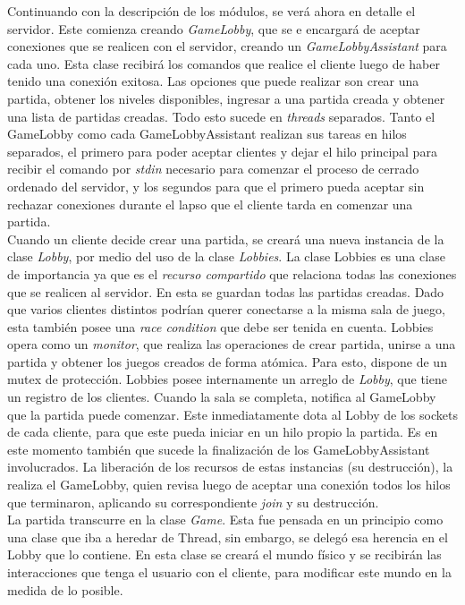 Continuando con la descripción de los módulos, se verá ahora en detalle el servidor. Este comienza creando \emph{GameLobby}, que se e encargará de aceptar conexiones que se realicen con el servidor, creando un \emph{GameLobbyAssistant} para cada uno. Esta clase recibirá los comandos que realice el cliente luego de haber tenido una conexión exitosa. Las opciones que puede realizar son crear una partida, obtener los niveles disponibles, ingresar a una partida creada y obtener una lista de partidas creadas. Todo esto sucede en  \emph{threads} separados. Tanto el GameLobby como cada GameLobbyAssistant realizan sus tareas en hilos separados, el primero para poder aceptar clientes y dejar el hilo principal para recibir el comando por \emph{stdin} necesario para comenzar el proceso de cerrado ordenado del servidor, y los segundos para que el primero pueda aceptar sin rechazar conexiones durante el lapso que el cliente tarda en comenzar una partida.\\
\indent Cuando un cliente decide crear una partida, se creará una nueva instancia de la clase \emph{Lobby}, por medio del uso de la clase \emph{Lobbies}. La clase Lobbies es una clase de importancia ya que es el \emph{recurso compartido} que relaciona todas las conexiones que se realicen al servidor. En esta se guardan todas las partidas creadas. Dado que varios clientes distintos podrían querer conectarse a la misma sala de juego, esta también posee una \emph{race condition} que debe ser tenida en cuenta. Lobbies opera como un \emph{monitor}, que realiza las operaciones de crear partida, unirse a una partida y obtener los juegos creados de forma atómica. Para esto, dispone de un mutex de protección. Lobbies posee internamente un arreglo de \emph{Lobby}, que tiene un registro de los clientes. Cuando la sala se completa, notifica al GameLobby que la partida puede comenzar. Este inmediatamente dota al Lobby de los sockets de cada cliente, para que este pueda iniciar en un hilo propio la partida. Es en este momento también que sucede la finalización de los GameLobbyAssistant involucrados. La liberación de los recursos de estas instancias (su destrucción), la realiza el GameLobby, quien revisa luego de aceptar una conexión  todos los hilos que terminaron, aplicando su correspondiente \emph{join} y su destrucción.\\
\indent La partida transcurre en la clase \emph{Game}. Esta fue pensada en un principio como una clase que iba a heredar de Thread, sin embargo, se delegó esa herencia en el Lobby que lo contiene. En esta clase se creará el mundo físico y se recibirán las interacciones que tenga el usuario con el cliente, para modificar este mundo en la medida de lo posible.\\
